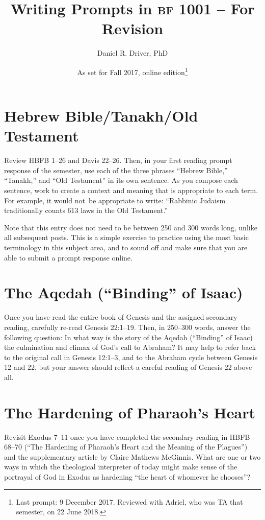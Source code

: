 \documentclass[12pt]{article}
\title{Writing Prompts in \textsc{bf} 1001 – For Revision}
\author{Daniel R. Driver, PhD}
\date{As set for Fall 2017, online edition\thanks{Last prompt: 9 December 2017. Reviewed with Adriel, who was TA that semester, on 22 June 2018.}}
\begin{document}
\maketitle

\section{Hebrew Bible/Tanakh/Old Testament}

Review HBFB 1–26 and Davis 22–26. Then, in your first reading prompt response of the semester, use each of the three phrases “Hebrew Bible,” “Tanakh,” and “Old Testament” in its own sentence. As you compose each sentence, work to create a context and meaning that is appropriate to each term. For example, it would not be appropriate to write: “Rabbinic Judaism traditionally counts 613 laws in the Old Testament.”

Note that this entry does not need to be between 250 and 300 words long, unlike all subsequent posts. This is a simple exercise to practice using the most basic terminology in this subject area, and to sound off and make sure that you are able to submit a prompt response online.


\section{The Aqedah (“Binding” of Isaac)}

Once you have read the entire book of Genesis and the assigned secondary reading, carefully re-read Genesis 22:1–19. Then, in 250–300 words, answer the following question: In what way is the story of the Aqedah (“Binding” of Isaac) the culmination and climax of God’s call to Abraham? It may help to refer back to the original call in Genesis 12:1–3, and to the Abraham cycle between Genesis 12 and 22, but your answer should reflect a careful reading of Genesis 22 above all.


\section{The Hardening of Pharaoh's Heart}

Revisit Exodus 7–11 once you have completed the secondary reading in HBFB 68–70 (“The Hardening of Pharaoh’s Heart and the Meaning of the Plagues”) and the supplementary article by Claire Mathews McGinnis. What are one or two ways in which the theological interpreter of today might make sense of the portrayal of God in Exodus as hardening “the heart of whomever he chooses”?
\end{document}
